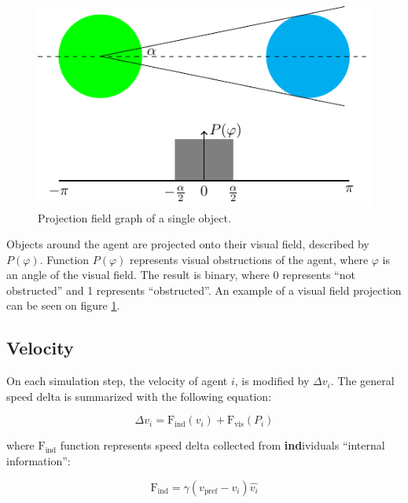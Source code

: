 \documentclass[9pt]{pnas-new}
\begin{document}
\begin{figure}
    \centering
    \includegraphics[width=0.9\linewidth]{projection}
    \caption{
       Projection field graph of a single object.
    }
    \label{fig:example-projection}
\end{figure}

\sloppy

Objects around the agent are projected onto their visual field, described by $P(\varphi)$.
Function $P(\varphi)$ represents visual obstructions of the agent, where $\varphi$ is an angle of the visual field. The result is binary, where 0 represents ``not obstructed'' and 1 represents ``obstructed''.
An example of a visual field projection can be seen on figure \ref{fig:example-projection}.

\fussy




\subsection{Velocity}

On each simulation step, the velocity of agent $i$, is modified by $\Delta v_i$.
The general speed delta is summarized with the following equation:

\begin{equation}
    \Delta v_i = \text{F}_{\text{ind}}(v_i) + \text{F}_{\text{vis}}(P_i)
\end{equation}

where $\text{F}_{\text{ind}}$ function represents speed delta collected from \textbf{ind}ividuals ``internal information'':

\begin{equation}
    \text{F}_{\text{ind}} = \gamma(v_\text{pref} - v_i)\hat{v_i}
\end{equation}
\end{document}
